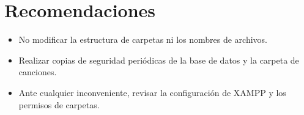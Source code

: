 \documentclass[a4paper,12pt]{article}
\begin{document}
\section{Recomendaciones}\label{sec:recomendaciones}
\begin{itemize}
    \item No modificar la estructura de carpetas ni los nombres de archivos.
    \item Realizar copias de seguridad periódicas de la base de datos y la carpeta de canciones.
    \item Ante cualquier inconveniente, revisar la configuración de XAMPP y los permisos de carpetas.
\end{itemize}
\end{document}

